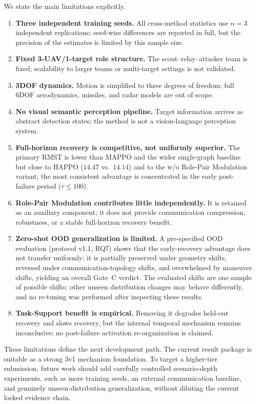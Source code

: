 We state the main limitations explicitly.

\begin{enumerate}
    \item \textbf{Three independent training seeds.} All cross-method statistics use $n=3$
    independent replications; seed-wise differences are reported in full, but the precision
    of the estimates is limited by this sample size.
    \item \textbf{Fixed 3-UAV/1-target role structure.} The scout--relay--attacker team is
    fixed; scalability to larger teams or multi-target settings is not validated.
    \item \textbf{3DOF dynamics.} Motion is simplified to three degrees of freedom; full
    6DOF aerodynamics, missiles, and radar models are out of scope.
    \item \textbf{No visual semantic perception pipeline.} Target information arrives as
    abstract detection states; the method is not a vision-language perception system.
    \item \textbf{Full-horizon recovery is competitive, not uniformly superior.} The primary
    RMST is lower than MAPPO and the wider single-graph baseline but close to HAPPO
    ($14.47$ vs.\ $14.14$) and to the w/o Role-Pair Modulation variant; the most consistent
    advantage is concentrated in the early post-failure period ($\tau \le 100$).
    \item \textbf{Role-Pair Modulation contributes little independently.} It is retained as
    an auxiliary component; it does not provide communication compression, robustness, or a
    stable full-horizon recovery benefit.
    \item \textbf{Zero-shot OOD generalization is limited.} A pre-specified OOD evaluation
    (protocol v1.1, RQ7) shows that the early-recovery advantage does not transfer uniformly:
    it is partially preserved under geometry shifts, reversed under communication-topology
    shifts, and overwhelmed by maneuver shifts, yielding an overall Gate~C verdict. The
    evaluated shifts are one sample of possible shifts; other unseen distribution changes may
    behave differently, and no re-tuning was performed after inspecting these results.
    \item \textbf{Task-Support benefit is empirical.} Removing it degrades held-out recovery
    and slows recovery, but the internal temporal mechanism remains inconclusive; no
    post-failure activation re-organization is claimed.
\end{enumerate}

These limitations define the next development path. The current result package is suitable
as a strong 3v1 mechanism foundation. To target a higher-tier submission, future work should
add carefully controlled scenario-depth experiments, such as more training seeds, an external
communication baseline, and genuinely unseen-distribution generalization, without diluting
the current locked evidence chain.
